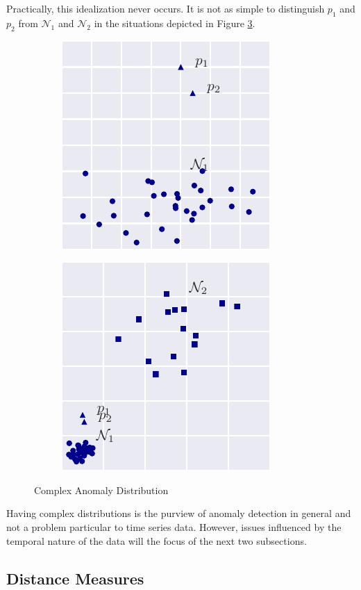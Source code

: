 Practically, this idealization never occurs. It is not as simple to distinguish $p_1$ and $p_2$ from $\mathcal{N}_1$ and $\mathcal{N}_2$ in the situations depicted in Figure \ref{fig:hard_dist}.

\begin{figure}[H]
  \centering
  \begin{subfigure}[H]{2in}
    \includegraphics{figs/hard1_dist.pdf}
    \caption{}
    \label{fig:hard1_dist}
  \end{subfigure}
  \begin{subfigure}[H]{2in}
    \includegraphics{figs/hard2_dist.pdf}
    \caption{}
    \label{fig:hard2_dist}
  \end{subfigure}
  \caption{Complex Anomaly Distribution}
  \label{fig:hard_dist}
\end{figure}

Having complex distributions is the purview of anomaly detection in general and not a problem particular to time series data. However, issues influenced by the temporal nature of the data will the focus of the next two subsections.

\subsection{Distance Measures}




